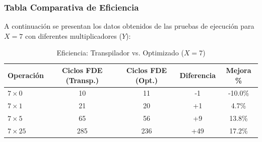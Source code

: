 \documentclass[12pt,a4paper]{article}
\begin{document}
\subsubsection{Tabla Comparativa de Eficiencia}
A continuación se presentan los datos obtenidos de las pruebas de ejecución para $X=7$ con diferentes multiplicadores ($Y$):

\begin{table}[H]
\centering
\caption{Eficiencia: Transpilador vs. Optimizado ($X=7$)}
\begin{tabular}{|l|c|c|c|c|}
\hline
\textbf{Operación} & \textbf{Ciclos FDE (Transp.)} & \textbf{Ciclos FDE (Opt.)} & \textbf{Diferencia} & \textbf{Mejora \%} \\ \hline
$7 \times 0$ & 10 & 11 & -1 & -10.0\% \\ \hline
$7 \times 1$ & 21 & 20 & +1 & 4.7\% \\ \hline
$7 \times 5$ & 65 & 56 & +9 & 13.8\% \\ \hline
$7 \times 25$ & 285 & 236 & +49 & 17.2\% \\ \hline
\end{tabular}
\end{table}
\end{document}
